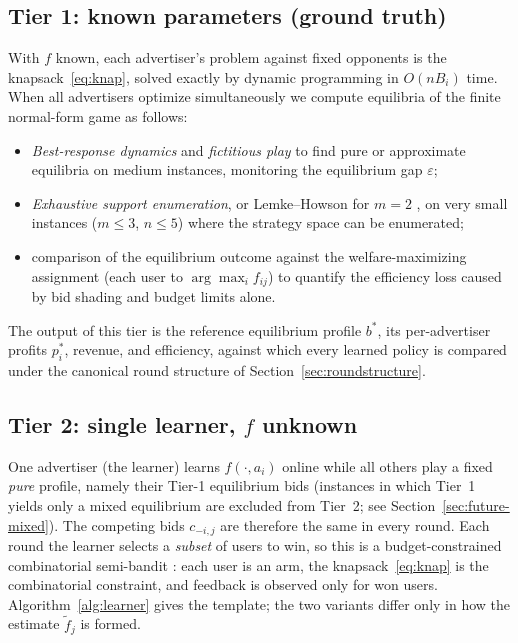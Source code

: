 \documentclass{article}
\theoremstyle{definition}
\theoremstyle{remark}
\begin{document}
\subsection{Tier 1: known parameters (ground truth)}
With $f$ known, each advertiser's problem against fixed opponents is the knapsack~\eqref{eq:knap}, solved exactly by dynamic programming in $O(nB_i)$ time. When all advertisers optimize simultaneously we compute equilibria of the finite normal-form game as follows:
\begin{itemize}[leftmargin=*]
  \item \emph{Best-response dynamics} and \emph{fictitious play} \citep{fudenberg1998theory} to find pure or approximate equilibria on medium instances, monitoring the equilibrium gap $\varepsilon$;
  \item \emph{Exhaustive support enumeration}, or Lemke--Howson for $m=2$ \citep{lemke1964equilibrium}, on very small instances ($m\le3$, $n\le5$) where the strategy space can be enumerated;
  \item comparison of the equilibrium outcome against the welfare-maximizing assignment (each user to $\arg\max_i f_{ij}$) to quantify the efficiency loss caused by bid shading and budget limits alone.
\end{itemize}
The output of this tier is the reference equilibrium profile $b^\ast$, its per-advertiser profits $p^\ast_i$, revenue, and efficiency, against which every learned policy is compared under the canonical round structure of Section~\ref{sec:roundstructure}.

\subsection{Tier 2: single learner, $f$ unknown}
One advertiser (the learner) learns $f(\cdot,a_i)$ online while all others play a fixed \emph{pure} profile, namely their Tier-1 equilibrium bids (instances in which Tier~1 yields only a mixed equilibrium are excluded from Tier~2; see Section~\ref{sec:future-mixed}). The competing bids $c_{-i,j}$ are therefore the same in every round. Each round the learner selects a \emph{subset} of users to win, so this is a budget-constrained combinatorial semi-bandit \citep{chen2013combinatorial,badanidiyuru2013bandits}: each user is an arm, the knapsack~\eqref{eq:knap} is the combinatorial constraint, and feedback is observed only for won users. Algorithm~\ref{alg:learner} gives the template; the two variants differ only in how the estimate $\tilde f_j$ is formed.
\end{document}
